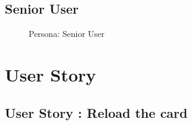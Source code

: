 \documentclass[12pt]{report}
\begin{document}
\subsection{Senior User}
\begin{figure}[!htb]
	\caption{\label{fig:senior_user}Persona: Senior User}
\end{figure}


\section{User Story}

\subsection{User Story : Reload the card}
\end{document}

